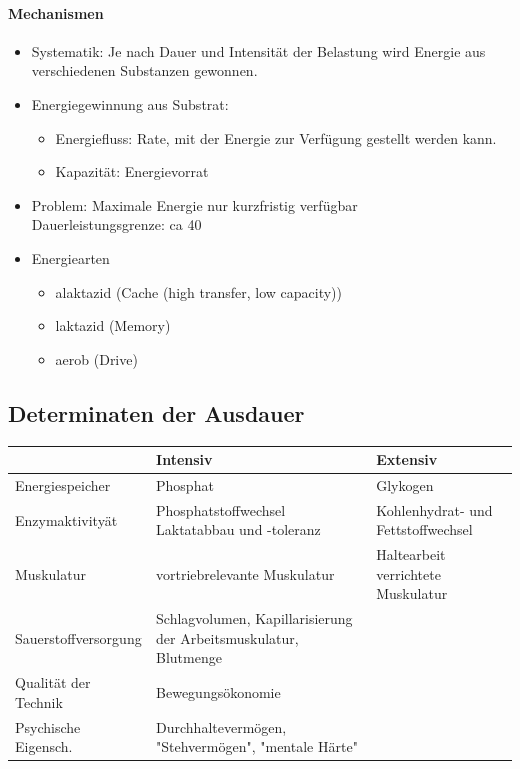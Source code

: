\paragraph{Mechanismen}
\begin{itemize}
  \item Systematik: Je nach Dauer und Intensität der Belastung wird Energie aus verschiedenen Substanzen gewonnen.
  \item Energiegewinnung aus Substrat:
    \begin{itemize}
      \item Energiefluss: Rate, mit der Energie zur Verfügung gestellt werden kann.
      \item Kapazität: Energievorrat
    \end{itemize}
  \item Problem: Maximale Energie nur kurzfristig verfügbar\\
    Dauerleistungsgrenze: ca 40%
  \item Energiearten
    \begin{itemize}
      \item alaktazid (Cache (high transfer, low capacity))
      \item laktazid (Memory)
      \item aerob (Drive)
    \end{itemize}
\end{itemize}

\subsection{Determinaten der Ausdauer}
\begin{centering}
\begin{tabular}{m{} | m{} | m{}}
                          & Intensiv                                                         & Extensiv \\ \hline
     Energiespeicher      & Phosphat                                                         & Glykogen \\ \hline                          
     Enzymaktivityät      & Phosphatstoffwechsel Laktatabbau und -toleranz                   & Kohlenhydrat- und Fettstoffwechsel \\ \hline
     Muskulatur           & vortriebrelevante Muskulatur                                     & Haltearbeit verrichtete Muskulatur \\ \hline
     Sauerstoffversorgung & Schlagvolumen, Kapillarisierung der Arbeitsmuskulatur, Blutmenge \\ \hline
     Qualität der Technik & Bewegungsökonomie \\ \hline                                               
     Psychische Eigensch. & Durchhaltevermögen, "Stehvermögen", "mentale Härte" \\
\end{tabular}
\end{centering}

